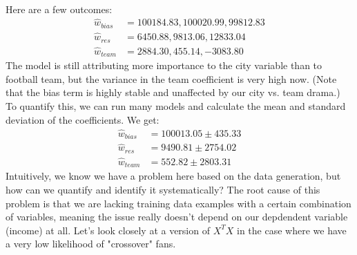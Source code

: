 \\
Here are a few outcomes:\\
\begin{align}
  \hat{w}_\mathit{bias} &= 100184.83, 100020.99, 99812.83 \\
  \hat{w}_\mathit{res}  &= 6450.88, 9813.06, 12833.04 \\
  \hat{w}_\mathit{team} &= 2884.30, 455.14, -3083.80
\end{align}
The model is still attributing more importance to the city variable than to
football team, but the variance in the team coefficient is very high now.
(Note that the bias term is highly stable and unaffected by our city vs. team
drama.)  To quantify this, we can run many models and calculate the mean and standard
deviation of the coefficients.  We get:\\
\begin{align}
  \hat{w}_\mathit{bias} &= 100013.05 \pm 435.33 \\
  \hat{w}_\mathit{res}  &= 9490.81 \pm 2754.02 \\
  \hat{w}_\mathit{team} &= 552.82 \pm 2803.31
\end{align}
Intuitively, we know we have a problem here based on the data generation, but
how can we quantify and identify it systematically?  The root cause of this
problem is that we are lacking training data examples with a certain combination
of variables, meaning the issue really doesn't depend on our depdendent variable
(income) at all.  Let's look closely at a version of $X^T X$ in the case where
we have a very low likelihood of "crossover" fans.

